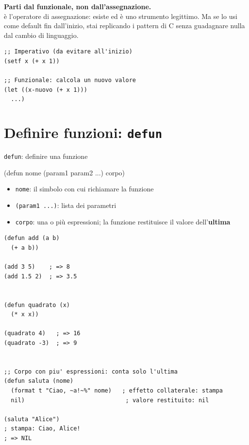 \begin{attenzione}
\textbf{Parti dal funzionale, non dall'assegnazione.}\\
 è l'operatore di assegnazione: esiste ed è uno strumento legittimo.
Ma se lo usi come default fin dall'inizio, stai replicando
i pattern di C senza guadagnare nulla dal cambio di linguaggio.
\begin{lstlisting}
;; Imperativo (da evitare all'inizio)
(setf x (+ x 1))

;; Funzionale: calcola un nuovo valore
(let ((x-nuovo (+ x 1)))
  ...)
\end{lstlisting}
\end{attenzione}

\section{Definire funzioni: \texttt{defun}}

\begin{concetto}{\texttt{defun}: definire una funzione}
\begin{sintassi}
(defun nome (param1 param2 ...) corpo)
\end{sintassi}
\begin{itemize}
  \item \texttt{nome}: il simbolo con cui richiamare la funzione
  \item \texttt{(param1 ...)}: lista dei parametri
  \item \texttt{corpo}: una o più espressioni; la funzione restituisce
        il valore dell'\textbf{ultima}
\end{itemize}
\end{concetto}

\begin{esempio}
\begin{lstlisting}
(defun add (a b)
  (+ a b))

(add 3 5)    ; => 8
(add 1.5 2)  ; => 3.5


(defun quadrato (x)
  (* x x))

(quadrato 4)   ; => 16
(quadrato -3)  ; => 9


;; Corpo con piu' espressioni: conta solo l'ultima
(defun saluta (nome)
  (format t "Ciao, ~a!~%" nome)   ; effetto collaterale: stampa
  nil)                             ; valore restituito: nil

(saluta "Alice")
; stampa: Ciao, Alice!
; => NIL
\end{lstlisting}
\end{esempio}

